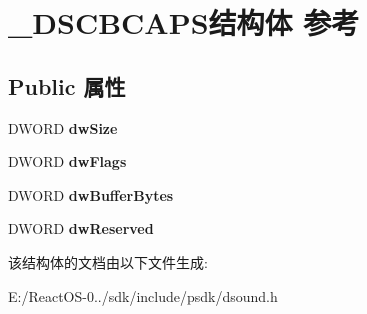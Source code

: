 \hypertarget{struct___d_s_c_b_c_a_p_s}{}\section{\+\_\+\+D\+S\+C\+B\+C\+A\+P\+S结构体 参考}
\label{struct___d_s_c_b_c_a_p_s}
\subsection*{Public 属性}
\begin{DoxyCompactItemize}
\item 
\mbox{\label{struct___d_s_c_b_c_a_p_s_a98ed4f69d2b011158b8a8d51d7268f35}} 
D\+W\+O\+RD {\bfseries dw\+Size}
\item 
\mbox{\label{struct___d_s_c_b_c_a_p_s_a0c39e1e2a6515ad4ee780f5a6f6729ff}} 
D\+W\+O\+RD {\bfseries dw\+Flags}
\item 
\mbox{\label{struct___d_s_c_b_c_a_p_s_a24423e75907ea752708c691e3cf486b8}} 
D\+W\+O\+RD {\bfseries dw\+Buffer\+Bytes}
\item 
\mbox{\label{struct___d_s_c_b_c_a_p_s_a8cab047dbf978f61365ca86c93317c00}} 
D\+W\+O\+RD {\bfseries dw\+Reserved}
\end{DoxyCompactItemize}


该结构体的文档由以下文件生成\+:\begin{DoxyCompactItemize}
\item 
E\+:/\+React\+O\+S-\/0../sdk/include/psdk/dsound.\+h\end{DoxyCompactItemize}
